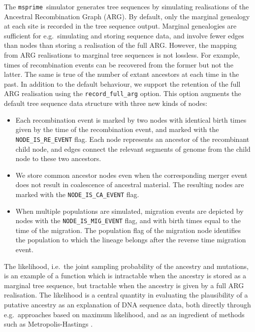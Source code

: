 \documentclass{article}
\newcommand{\msprime}[0]{\texttt{msprime}}
\begin{document}
The \msprime~simulator generates tree sequences by simulating realisations of the
Ancestral Recombination Graph (ARG).
By default, only the marginal genealogy at each site is recorded in the tree sequence
output.
Marginal genealogies are sufficient for e.g.~simulating and storing sequence data,
and involve fewer edges than nodes than storing a realisation of the full ARG.
However, the mapping from ARG realisations to marginal tree sequences is not lossless.
For example, times of recombination events can be recovered from the former
but not the latter.
The same is true of the number of extant ancestors at each time in the past.
In addition to the default behaviour, we support the retention of the full
ARG realisation using the \texttt{record\_full\_arg} option.
This option augments the default tree sequence data structure with three
new kinds of nodes:
\begin{itemize}
\item Each recombination event is marked by two nodes with identical birth times
given by the time of the recombination event, and marked with the
\texttt{NODE\_IS\_RE\_EVENT} flag.
Each node represents an ancestor of the recombinant child node, and edges connect
the relevant segments of genome from the child node to these two ancestors.
\item We store common ancestor nodes even when the corresponding merger event
does not result in coalescence of ancestral material.
The resulting nodes are marked with the \texttt{NODE\_IS\_CA\_EVENT} flag.
\item When multiple populations are simulated, migration events are depicted by nodes
with the \texttt{NODE\_IS\_MIG\_EVENT} flag, and with birth times equal to the time of
the migration.
The population flag of the migration node identifies the population to which the lineage
belongs after the reverse time migration event.
\end{itemize}

The likelihood, i.e.~the joint sampling probability of the ancestry and mutations,
is an example of a function which is intractable when the ancestry is stored as a
marginal tree sequence, but tractable when the ancestry is given by a full
ARG realisation.
The likelihood is a central quantity in evaluating the plausibility of a putative
ancestry as an explanation of DNA sequence data, both directly through
e.g.~approaches based on maximum likelihood, and as an ingredient of
methods such as Metropolis-Hastings
\citep{kuhner2000maximum, nielsen2000estimation, wang2008bayesian}.
\end{document}
